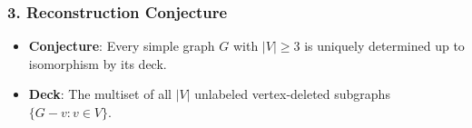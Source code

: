 \documentclass[
]{book}
\providecommand{\tightlist}{%
  \setlength{\itemsep}{0pt}\setlength{\parskip}{0pt}}
\theoremstyle{definition}
\theoremstyle{definition}
\theoremstyle{definition}
\theoremstyle{definition}
\theoremstyle{remark}
\begin{document}
\subsubsection{3. Reconstruction Conjecture}\label{reconstruction-conjecture}

\begin{itemize}
\tightlist
\item
  \textbf{Conjecture}: Every simple graph \(G\) with \(\vert{}V\vert{} \ge 3\) is uniquely determined up to isomorphism by its deck.
\item
  \textbf{Deck}: The multiset of all \(\vert{}V\vert{}\) unlabeled vertex-deleted subgraphs \(\{G - v : v \in V\}\).
\end{itemize}


\end{document}
